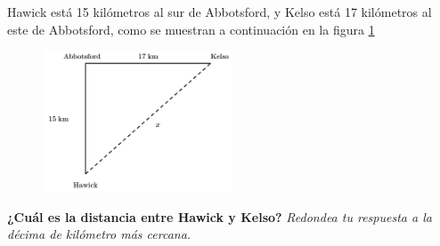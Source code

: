 \question[15]  Hawick está 15 kilómetros al sur de Abbotsford,
y Kelso está 17 kilómetros al este de Abbotsford,
como se muestran a continuación en la figura \ref{fig:proverb_pitagoras_08}
\begin{figure}[H]
    \begin{center}
        \includegraphics[width=0.5\textwidth]{../images/proverb_pitagoras_08.png}
    \end{center}
    \caption{}
    \label{fig:proverb_pitagoras_08}
\end{figure}
\textbf{¿Cuál es la distancia entre Hawick y Kelso?}
\textit{Redondea tu respuesta a la décima de kilómetro más cercana.}